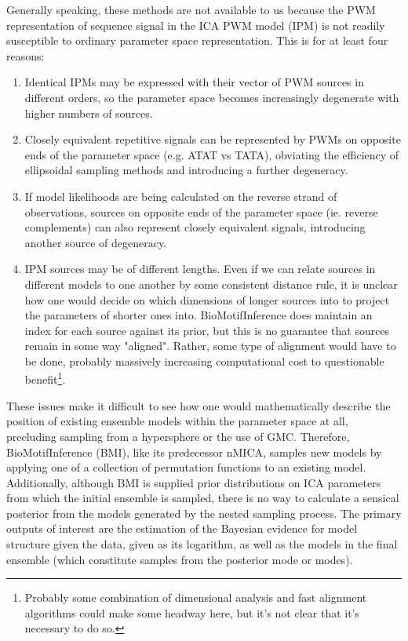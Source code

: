 Generally speaking, these methods are not available to us because the PWM representation of sequence signal in the ICA PWM model (IPM) is not readily susceptible to ordinary parameter space representation. This is for at least four reasons:

\begin{enumerate}
    \item Identical IPMs may be expressed with their vector of PWM sources in different orders, so the parameter space becomes increasingly degenerate with higher numbers of sources.
    \item Closely equivalent repetitive signals can be represented by PWMs on opposite ends of the parameter space (e.g. ATAT vs TATA), obviating the efficiency of ellipsoidal sampling methods and introducing a further degeneracy.
    \item If model likelihoods are being calculated on the reverse strand of observations, sources on opposite ends of the parameter space (ie. reverse complements) can also represent closely equivalent signals, introducing another source of degeneracy.
    \item IPM sources may be of different lengths. Even if we can relate sources in different models to one another by some consistent distance rule, it is unclear how one would decide on which dimensions of longer sources into to project the parameters of shorter ones into. BioMotifInference does maintain an index for each source against its prior, but this is no guarantee that sources remain in some way "aligned". Rather, some type of alignment would have to be done, probably massively increasing computational cost to questionable benefit\footnote{Probably some combination of dimensional analysis and fast alignment algorithms could make some headway here, but it's not clear that it's necessary to do so.}.
\end{enumerate}

These issues make it difficult to see how one would mathematically describe the position of existing ensemble models within the parameter space at all, precluding sampling from a hypersphere or the use of GMC. Therefore, BioMotifInference (BMI), like its predecessor nMICA, samples new models by applying one of a collection of permutation functions to an existing model. Additionally, although BMI is supplied prior distributions on ICA parameters from which the initial ensemble is sampled, there is no way to calculate a sensical posterior from the models generated by the nested sampling process. The primary outputs of interest are the estimation of the Bayesian evidence for model structure given the data, given as its logarithm, as well as the models in the final ensemble (which constitute samples from the posterior mode or modes).

